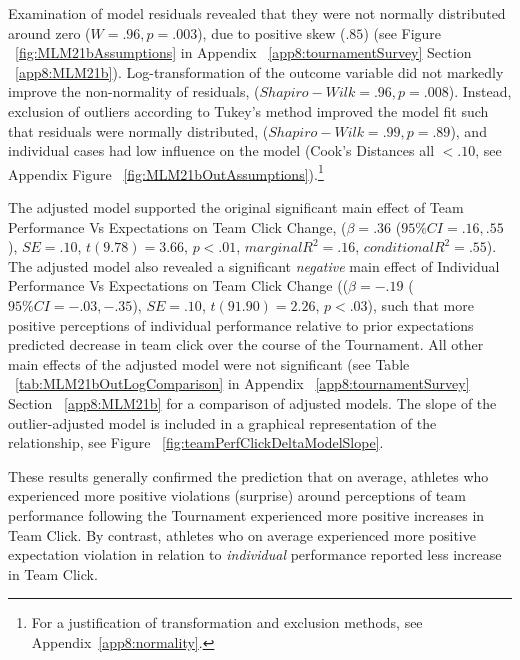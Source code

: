 \begin{CJK}{UTF8}{gbsn}
Examination of model residuals revealed that they were not normally distributed around zero ($W = .96, p = .003$), due to positive skew ($.85$) (see Figure ~\ref{fig:MLM21bAssumptions} in Appendix ~\ref{app8:tournamentSurvey} Section ~\ref{app8:MLM21b}). Log-transformation of the outcome variable did not markedly improve the non-normality of residuals, ($Shapiro-Wilk = .96, p = .008$).    Instead, exclusion of outliers according to Tukey's method \citep[observations above and below 1.5x the Inter Quartile Range (IQR); see][]{Tukey1977} improved the model fit such that residuals were normally distributed, ($Shapiro-Wilk = .99, p = .89$), and individual cases had low influence on the model (Cook's Distances all $< .10$, see Appendix Figure ~\ref{fig:MLM21bOutAssumptions}).\footnote{For a justification of transformation and exclusion methods, see Appendix~\ref{app8:normality}.}

The adjusted model supported the original significant main effect of Team Performance Vs Expectations on Team Click Change, ($\beta = .36$ ($95\% CI =  .16, .55$), $SE = .10$, $t(9.78) = 3.66$, $p < .01$, $marginal R^2 = .16$, $conditional R^2 = .55$). The adjusted model also revealed a significant \textit{negative} main effect of Individual Performance Vs Expectations on Team Click Change (($\beta = -.19$ ($95\% CI =  -.03, -.35$), $SE = .10$, $t(91.90) = 2.26$, $p < .03$), such that more positive perceptions of individual performance relative to prior expectations predicted decrease in team click over the course of the Tournament.  All other main effects of the adjusted model were not significant (see Table ~\ref{tab:MLM21bOutLogComparison}  in Appendix ~\ref{app8:tournamentSurvey} Section ~\ref{app8:MLM21b} for a comparison of adjusted models.  The slope of the outlier-adjusted model is included in a graphical representation of the relationship, see Figure ~\ref{fig:teamPerfClickDeltaModelSlope}.

These results generally confirmed the prediction that on average, athletes who experienced more positive violations (surprise) around perceptions of team performance following the Tournament experienced more positive increases in Team Click. By contrast, athletes who on average experienced more positive expectation violation in relation to \textit{individual} performance reported less increase in Team Click.




\end{CJK}
